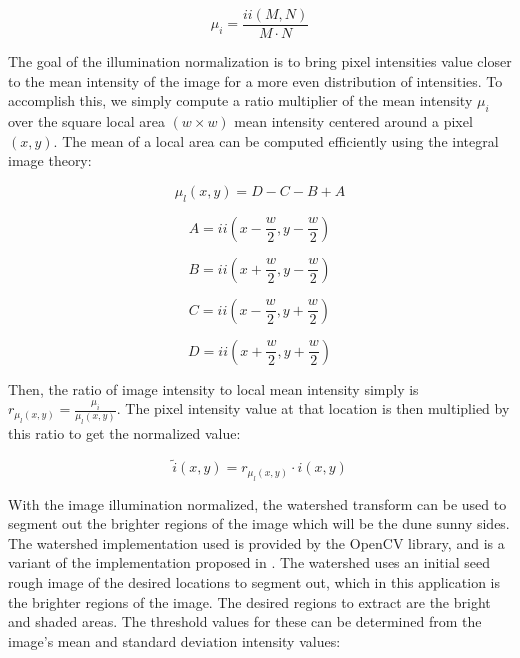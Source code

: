 \begin{equation}
\mu_{i}=\frac{ii\left(M,N\right)}{M\cdot N}
\end{equation}

The goal of the illumination normalization is to bring pixel intensities value closer to the mean intensity of the image for a more even distribution of intensities. To accomplish this, we simply compute a ratio multiplier of the mean intensity $\mu_{i}$ over the square local area $(w\times w)$ mean intensity centered around a pixel $(x,y)$. The mean of a local area can be computed efficiently using the integral image theory:

\begin{equation}
\mu_{l}\left(x,y\right)=D-C-B+A
\end{equation}

\begin{equation}
A=ii\left(x-\frac{w}{2},y-\frac{w}{2}\right)
\end{equation}

\begin{equation}
B=ii\left(x+\frac{w}{2},y-\frac{w}{2}\right)
\end{equation}

\begin{equation}
C=ii\left(x-\frac{w}{2},y+\frac{w}{2}\right)
\end{equation}

\begin{equation}
D=ii\left(x+\frac{w}{2},y+\frac{w}{2}\right)
\end{equation}

Then, the ratio of image intensity to local mean intensity simply is $r_{\mu_{l}\left(x,y\right)}=\frac{\mu_{i}}{\mu_{l}\left(x,y\right)}$. The pixel intensity value at that location is then multiplied by this ratio to get the normalized value:

\begin{equation}
\tilde{i}\left(x,y\right)=r_{\mu_{l}\left(x,y\right)}\cdot i\left(x,y\right)
\end{equation}

With the image illumination normalized, the watershed transform can be used to segment out the brighter regions of the image which will be the dune sunny sides. The watershed implementation used is provided by the OpenCV library, and is a variant of the implementation proposed in \cite{Color-image-segmentation}. The watershed uses an initial seed rough image of the desired locations to segment out, which in this application is the brighter regions of the image. The desired regions to extract are the bright and shaded areas. The threshold values for these can be determined from the image's mean and standard deviation intensity values:

